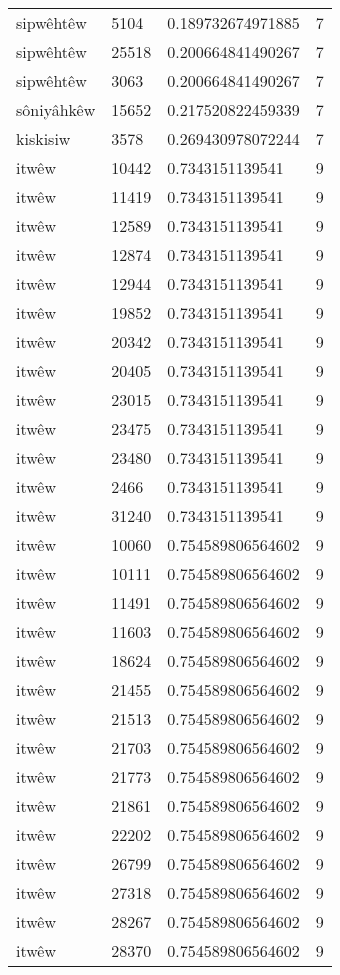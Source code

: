 \begin{longtable}{llll}
sipwêhtêw & 5104 & 0.189732674971885 & 7 \\
sipwêhtêw & 25518 & 0.200664841490267 & 7 \\
sipwêhtêw & 3063 & 0.200664841490267 & 7 \\
sôniyâhkêw & 15652 & 0.217520822459339 & 7 \\
kiskisiw & 3578 & 0.269430978072244 & 7 \\
itwêw & 10442 & 0.7343151139541 & 9 \\
itwêw & 11419 & 0.7343151139541 & 9 \\
itwêw & 12589 & 0.7343151139541 & 9 \\
itwêw & 12874 & 0.7343151139541 & 9 \\
itwêw & 12944 & 0.7343151139541 & 9 \\
itwêw & 19852 & 0.7343151139541 & 9 \\
itwêw & 20342 & 0.7343151139541 & 9 \\
itwêw & 20405 & 0.7343151139541 & 9 \\
itwêw & 23015 & 0.7343151139541 & 9 \\
itwêw & 23475 & 0.7343151139541 & 9 \\
itwêw & 23480 & 0.7343151139541 & 9 \\
itwêw & 2466 & 0.7343151139541 & 9 \\
itwêw & 31240 & 0.7343151139541 & 9 \\
itwêw & 10060 & 0.754589806564602 & 9 \\
itwêw & 10111 & 0.754589806564602 & 9 \\
itwêw & 11491 & 0.754589806564602 & 9 \\
itwêw & 11603 & 0.754589806564602 & 9 \\
itwêw & 18624 & 0.754589806564602 & 9 \\
itwêw & 21455 & 0.754589806564602 & 9 \\
itwêw & 21513 & 0.754589806564602 & 9 \\
itwêw & 21703 & 0.754589806564602 & 9 \\
itwêw & 21773 & 0.754589806564602 & 9 \\
itwêw & 21861 & 0.754589806564602 & 9 \\
itwêw & 22202 & 0.754589806564602 & 9 \\
itwêw & 26799 & 0.754589806564602 & 9 \\
itwêw & 27318 & 0.754589806564602 & 9 \\
itwêw & 28267 & 0.754589806564602 & 9 \\
itwêw & 28370 & 0.754589806564602 & 9 \\

\end{longtable}
